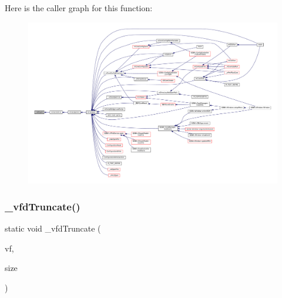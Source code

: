 Here is the caller graph for this function\+:
\nopagebreak
\begin{figure}[H]
\begin{center}
\leavevmode
\includegraphics[width=350pt]{vfs-fd_8c_a53a7d14ded6594e1dd5e9ace626fb413_icgraph}
\end{center}
\end{figure}
\mbox{\label{vfs-fd_8c_a3ea37b047d1a73e301cc14c70f7e232e}} 
\subsubsection{\texorpdfstring{\+\_\+vfd\+Truncate()}{\_vfdTruncate()}}
{\footnotesize\ttfamily static void \+\_\+vfd\+Truncate (\begin{DoxyParamCaption}\item[{struct V\+File $\ast$}]{vf,  }\item[{size\+\_\+t}]{size }\end{DoxyParamCaption})\hspace{0.3cm}{\ttfamily [static]}}

